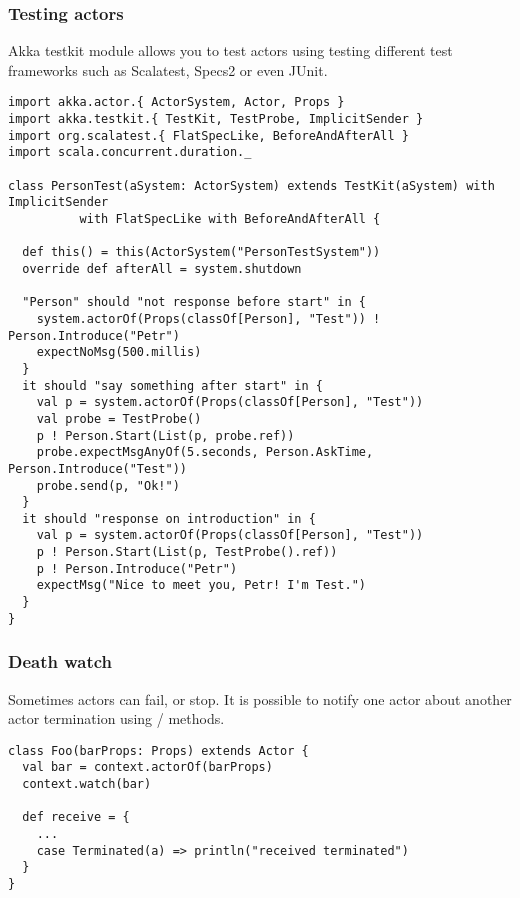 \begin{frame}[fragile]
\frametitle{Testing actors}
  Akka testkit module allows you to test actors using testing different test frameworks
such as Scalatest, Specs2 or even JUnit.
\begin{lstlisting}
import akka.actor.{ ActorSystem, Actor, Props }
import akka.testkit.{ TestKit, TestProbe, ImplicitSender }
import org.scalatest.{ FlatSpecLike, BeforeAndAfterAll }
import scala.concurrent.duration._

class PersonTest(aSystem: ActorSystem) extends TestKit(aSystem) with ImplicitSender
          with FlatSpecLike with BeforeAndAfterAll {

  def this() = this(ActorSystem("PersonTestSystem"))
  override def afterAll = system.shutdown

  "Person" should "not response before start" in {
    system.actorOf(Props(classOf[Person], "Test")) ! Person.Introduce("Petr")
    expectNoMsg(500.millis)
  }
  it should "say something after start" in {
    val p = system.actorOf(Props(classOf[Person], "Test"))
    val probe = TestProbe()
    p ! Person.Start(List(p, probe.ref))
    probe.expectMsgAnyOf(5.seconds, Person.AskTime, Person.Introduce("Test"))
    probe.send(p, "Ok!")
  }
  it should "response on introduction" in {
    val p = system.actorOf(Props(classOf[Person], "Test"))
    p ! Person.Start(List(p, TestProbe().ref))
    p ! Person.Introduce("Petr")
    expectMsg("Nice to meet you, Petr! I'm Test.")
  }
}
\end{lstlisting}
\end{frame}

\begin{frame}[fragile]
\frametitle{Death watch}
Sometimes actors can fail, or stop. It is possible to notify one actor about another actor
termination using  /  methods.
\begin{lstlisting}
class Foo(barProps: Props) extends Actor {
  val bar = context.actorOf(barProps)
  context.watch(bar)

  def receive = {
    ...
    case Terminated(a) => println("received terminated")
  }
}
\end{lstlisting}
\end{frame}

